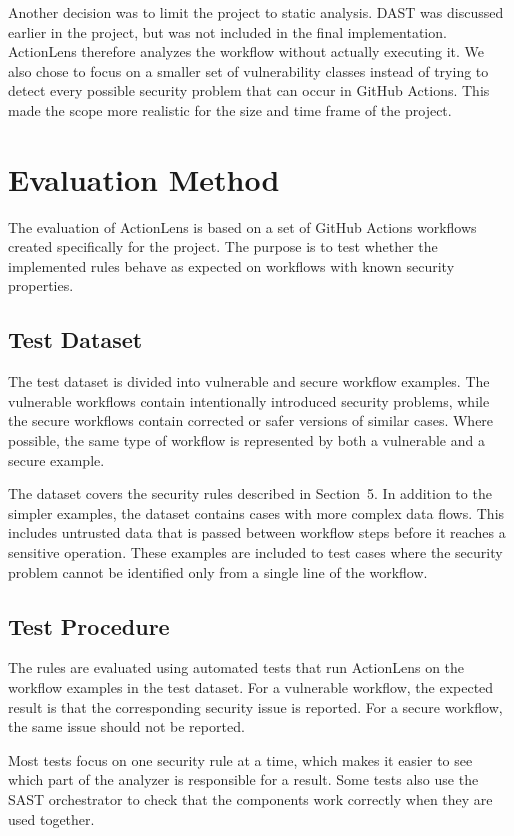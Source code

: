 \documentclass{article}
\begin{document}
Another decision was to limit the project to static analysis. DAST was discussed earlier in the project, but was not included in the final implementation. ActionLens therefore analyzes the workflow without actually executing it. We also chose to focus on a smaller set of vulnerability classes instead of trying to detect every possible security problem that can occur in GitHub Actions. This made the scope more realistic for the size and time frame of the project.

\section{Evaluation Method}

The evaluation of ActionLens is based on a set of GitHub Actions workflows created specifically for the project. The purpose is to test whether the implemented rules behave as expected on workflows with known security
properties.

\subsection{Test Dataset}

The test dataset is divided into vulnerable and secure workflow examples. The vulnerable workflows contain intentionally introduced security problems, while the secure workflows contain corrected or safer versions of similar cases. Where possible, the same type of workflow is represented by both a vulnerable and a secure example.

The dataset covers the security rules described in Section~5. In addition to the simpler examples, the dataset contains cases with more complex data flows. This includes untrusted data that is passed between workflow steps before it reaches a sensitive operation. These examples are included to test cases where the security problem cannot be identified only from a single line of the workflow.

\subsection{Test Procedure}

The rules are evaluated using automated tests that run ActionLens on the workflow examples in the test dataset. For a vulnerable workflow, the expected result is that the corresponding security issue is reported. For a secure workflow, the same issue should not be reported.

Most tests focus on one security rule at a time, which makes it easier to see which part of the analyzer is responsible for a result. Some tests also use the SAST orchestrator to check that the components work correctly when they are used together.
\end{document}
